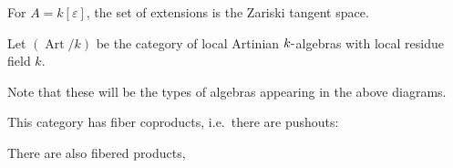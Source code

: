 \begin{center}
\end{center}

\begin{description}
\tightlist
\item[Example]
For \(A = k[\varepsilon]\), the set of extensions is the Zariski tangent
space.
\item[Definition (Category of Artinian Algebras)]
Let \((\operatorname{Art}/k)\) be the category of local Artinian
\(k{\hbox{-}}\)algebras with local residue field \(k\).
\end{description}

Note that these will be the types of algebras appearing in the above
diagrams.

\begin{description}
\tightlist
\item[Remark]
This category has fiber coproducts, i.e.~there are pushouts:
\end{description}

\begin{center}
  \end{center}

There are also fibered products,

\begin{center}
  \end{center}

